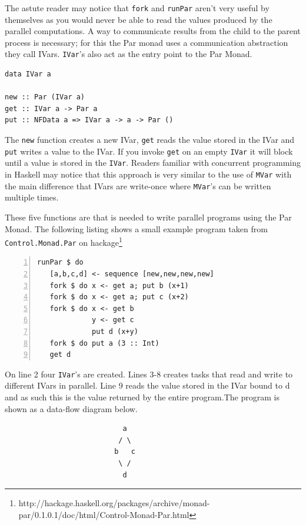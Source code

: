 \documentclass[a4paper, oneside, final]{memoir}
\begin{document}
The astute reader may notice that \texttt{fork} and \texttt{runPar} aren't very useful by themselves as you would never be able to read the values produced by the parallel computations. A way to communicate results from the child to the parent process is necessary; for this the Par monad uses a communication abstraction they call IVars. \texttt{IVar}'s also act as the entry point to the Par Monad. \newline

\begin{lstlisting}
data IVar a 

new :: Par (IVar a)
get :: IVar a -> Par a
put :: NFData a => IVar a -> a -> Par ()
\end{lstlisting}

The \texttt{new} function creates a new IVar, \texttt{get} reads the
value stored in the IVar and \texttt{put} writes a value to the IVar.
If you invoke \texttt{get} on an empty \texttt{IVar} it will block
until a value is stored in the \texttt{IVar}. Readers familiar with
concurrent programming in Haskell may notice that this approach is
very similar to the use of \texttt{MVar} with the main difference that
IVars are write-once where \texttt{MVar}'s can be written multiple
times.

These five functions are that is needed to write parallel programs
using the Par Monad. The following listing shows a small example
program taken from \texttt{Control.Monad.Par} on
hackage\footnote{http://hackage.haskell.org/packages/archive/monad-
par/0.1.0.1/doc/html/Control-Monad-Par.html} \newline

\begin{lstlisting}[numbers=left, numberstyle=\tiny]
runPar $ do
   [a,b,c,d] <- sequence [new,new,new,new]
   fork $ do x <- get a; put b (x+1)
   fork $ do x <- get a; put c (x+2)
   fork $ do x <- get b
             y <- get c 
             put d (x+y)
   fork $ do put a (3 :: Int)
   get d
\end{lstlisting}

On line 2 four \texttt{IVar}'s are created. Lines 3-8 creates tasks
that read and write to different IVars in parallel. Line 9 reads the
value stored in the IVar bound to d and as such this is the value
returned by the entire program.The program is shown as a data-flow
diagram below. \newline

\begin{lstlisting}
                            a
                           / \  
                          b   c
                           \ /
                            d
\end{lstlisting}
\end{document}
